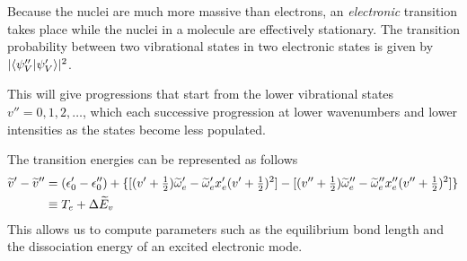 \begin{thrm}
Because the nuclei are much more massive than electrons, an \emph{electronic} transition takes place while the nuclei in a molecule are effectively stationary. The transition probability between two vibrational states in two electronic states is given by $|\langle \psi''_V | \psi_V' \rangle|^2$.
\end{thrm}
This will give progressions that start from the lower vibrational states $v''=0,1,2,\dots$, which each successive progression at lower wavenumbers and lower intensities as the states become less populated.\par
The transition energies can be represented as follows
\begin{equation}
\begin{aligned}
	\widetilde{v}'-\widetilde{v}''&=(\epsilon_0'-\epsilon_0'')+\{[(v'+\tfrac{1}{2})\widetilde{\omega}'_e-\widetilde{\omega}'_ex_e'(v'+\tfrac{1}{2} )^2]-[(v''+\tfrac{1}{2})\widetilde{\omega}''_e-\widetilde{\omega}''_ex_e''(v''+\tfrac{1}{2} )^2]\}\\
	&\equiv T_e+\Delta \widetilde{E}_v 
\end{aligned}
\end{equation}
This allows us to compute parameters such as the equilibrium bond length and the dissociation energy of an excited electronic mode.
